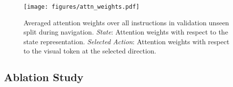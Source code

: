 \documentclass[final]{cvpr}
\begin{document}
\begin{figure}[t]
  \centering
  \texttt{[image: figures/attn\_weights.pdf]}
  \caption{Averaged attention weights over all instructions in validation unseen split during navigation. \textit{State}: Attention weights with respect to the state representation. \textit{Selected Action}: Attention weights with respect to the visual token at the selected direction.}
  \label{fig:attn_weights}
  \vspace{-1.5em}
\end{figure}



\subsection{Ablation Study}
\end{document}
